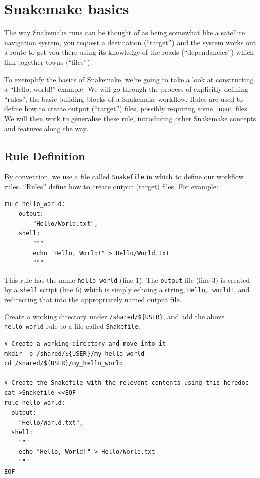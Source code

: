 \section{Snakemake basics}

The way Snakemake runs can be thought of as being somewhat like a satellite navigation system, you request a destination
(``target'') and the system works out a route to get you there using its knowledge of the roads (``dependancies'') which
link together towns (``files'').

To exemplify the basics of Snakemake, we're going to take a look at constructing a ``Hello, world!'' example. We will go
through the process of explicitly defining ``rules'', the basic building blocks of a Snakemake workflow. Rules are used to
define how to create output (``target'') files, possibly requiring some \texttt{input} files. We will then work to
generalise these rule, introducing other Snakemake concepts and features along the way.

\subsection{Rule Definition}

By convention, we use a file called \texttt{Snakefile} in which to define our workflow rules. ``Rules'' define how to
create output (target) files. For example:

\begin{lstlisting}
rule hello_world:
	output:
		"Hello/World.txt",
	shell:
		"""
		echo "Hello, World!" > Hello/World.txt
		"""
\end{lstlisting}

This rule has the name \texttt{hello\_world} (line 1). The \texttt{output} file (line 3) is created by a \texttt{shell} script (line 6) which is
simply echoing a string, \texttt{Hello, world!}, and redirecting that into the appropriately named output file.

\begin{steps}

Create a working directory under \texttt{/shared/\$\{USER\}}, and add the above \texttt{hello\_world} rule to a file called \texttt{Snakefile}:

\begin{lstlisting}
# Create a working directory and move into it
mkdir -p /shared/${USER}/my_hello_world
cd /shared/${USER}/my_hello_world

# Create the Snakefile with the relevant contents using this heredoc
cat >Snakefile <<EOF
rule hello_world:
  output:
    "Hello/World.txt",
  shell:
    """
    echo "Hello, World!" > Hello/World.txt
    """
EOF
\end{lstlisting}

\end{steps}

